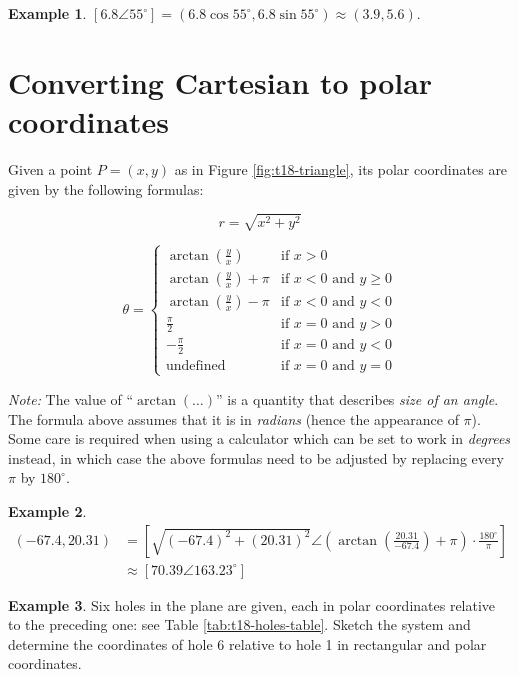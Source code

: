 \documentclass[
  english,
  12pt,
  oneside]{book}
\theoremstyle{definition}
\theoremstyle{definition}
\newtheorem{example}{Example}[chapter]
\theoremstyle{definition}
\theoremstyle{definition}
\theoremstyle{remark}
\begin{document}
\begin{example}
\([6.8\angle 55^\circ] = (6.8\cos 55^\circ,6.8\sin 55^\circ) \approx(3.9,5.6)\).
\end{example}

\section{Converting Cartesian to polar coordinates}\label{converting-cartesian-to-polar-coordinates}

Given a point \(P=(x,y)\) as in Figure \ref{fig:t18-triangle}, its polar coordinates are given by the following formulas:

\[\boxed{r=\sqrt{x^2+y^2}}\]

\[\boxed{\theta=\begin{cases}
        \arctan(\frac{y}{x}) & \text{if }x>0\\
        \arctan(\frac{y}{x})+\pi &\text{if }x<0\text{ and }y\geq0\\
        \arctan(\frac{y}{x})-\pi &\text{if }x<0\text{ and }y<0\\
        \frac{\pi}2&\text{if }x=0\text{ and }y>0\\
        -\frac{\pi}2&\text{if }x=0\text{ and }y<0\\
        \text{undefined} &\text{if }x=0\text{ and }y=0
\end{cases}}\]

\emph{Note:} The value of ``\(\arctan(\dots)\)'' is a quantity that describes \emph{size of an angle}. The formula above assumes that it is in \emph{radians} (hence the appearance of \(\pi\)). Some care is required when using a calculator which can be set to work in \emph{degrees} instead, in which case the above formulas need to be adjusted by replacing every \(\pi\) by \(180^\circ\).

\begin{example}
\protect\hypertarget{exm:t18-cart-to-polar}{}\label{exm:t18-cart-to-polar}\begin{align*}
(-67.4,20.31) &= \left[\sqrt{(-67.4)^2+(20.31)^2}\angle \left(\arctan\left(\frac{20.31}{-67.4}\right)+\pi\right)\cdot\frac{180^\circ}{\pi}\right]\\
&\approx\left[70.39\angle 163.23^\circ\right]
\end{align*}
\end{example}

\begin{example}
Six holes in the plane are given, each in polar coordinates relative to the preceding one: see Table \ref{tab:t18-holes-table}. Sketch the system and determine the coordinates of hole 6 relative to hole 1 in rectangular and polar coordinates.
\end{example}
\end{document}
